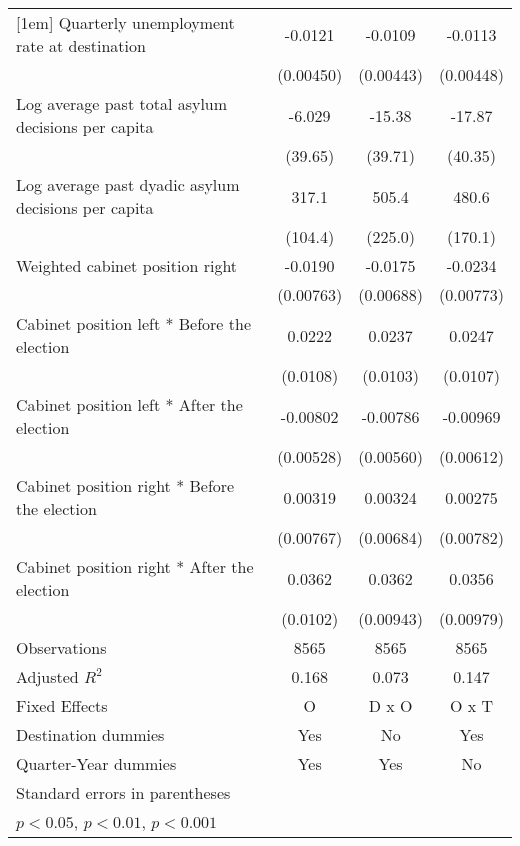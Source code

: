 \begin{table}[htbp]
\begin{tabular}{l*{3}{c}}
[1em]
Quarterly unemployment rate at destination&     -0.0121\sym{*}  &     -0.0109\sym{*}  &     -0.0113\sym{*}  \\
                    &   (0.00450)         &   (0.00443)         &   (0.00448)         \\
[1em]
Log average past total asylum decisions per capita&      -6.029         &      -15.38         &      -17.87         \\
                    &     (39.65)         &     (39.71)         &     (40.35)         \\
[1em]
Log average past dyadic asylum decisions per capita&       317.1\sym{**} &       505.4\sym{*}  &       480.6\sym{**} \\
                    &     (104.4)         &     (225.0)         &     (170.1)         \\
[1em]
Weighted cabinet position right&     -0.0190\sym{*}  &     -0.0175\sym{*}  &     -0.0234\sym{**} \\
                    &   (0.00763)         &   (0.00688)         &   (0.00773)         \\
[1em]
Cabinet position left * Before the election&      0.0222\sym{*}  &      0.0237\sym{*}  &      0.0247\sym{*}  \\
                    &    (0.0108)         &    (0.0103)         &    (0.0107)         \\
[1em]
Cabinet position left * After the election&    -0.00802         &    -0.00786         &    -0.00969         \\
                    &   (0.00528)         &   (0.00560)         &   (0.00612)         \\
[1em]
Cabinet position right * Before the election&     0.00319         &     0.00324         &     0.00275         \\
                    &   (0.00767)         &   (0.00684)         &   (0.00782)         \\
[1em]
Cabinet position right * After the election&      0.0362\sym{**} &      0.0362\sym{***}&      0.0356\sym{***}\\
                    &    (0.0102)         &   (0.00943)         &   (0.00979)         \\
\hline
Observations        &        8565         &        8565         &        8565         \\
Adjusted \(R^{2}\)  &       0.168         &       0.073         &       0.147         \\
Fixed Effects       &           O         &       D x O         &       O x T         \\
Destination dummies &         Yes         &          No         &         Yes         \\
Quarter-Year dummies&         Yes         &         Yes         &          No         \\
\hline\hline
\multicolumn{4}{l}{\footnotesize Standard errors in parentheses}\\
\multicolumn{4}{l}{\footnotesize \sym{*} \(p<0.05\), \sym{**} \(p<0.01\), \sym{***} \(p<0.001\)}\\
\end{tabular}
\end{table}
